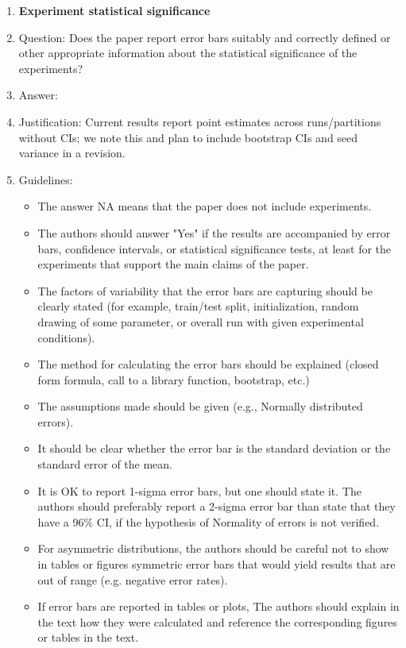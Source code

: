 \documentclass{article}
\begin{document}
\begin{enumerate}
\item {\bf Experiment statistical significance}
    \item[] Question: Does the paper report error bars suitably and correctly defined or other appropriate information about the statistical significance of the experiments?
    \item[] Answer: \answerNo{}
    \item[] Justification: Current results report point estimates across runs/partitions without CIs; we note this and plan to include bootstrap CIs and seed variance in a revision.
    \item[] Guidelines:
    \begin{itemize}
        \item The answer NA means that the paper does not include experiments.
        \item The authors should answer "Yes" if the results are accompanied by error bars, confidence intervals, or statistical significance tests, at least for the experiments that support the main claims of the paper.
        \item The factors of variability that the error bars are capturing should be clearly stated (for example, train/test split, initialization, random drawing of some parameter, or overall run with given experimental conditions).
        \item The method for calculating the error bars should be explained (closed form formula, call to a library function, bootstrap, etc.)
        \item The assumptions made should be given (e.g., Normally distributed errors).
        \item It should be clear whether the error bar is the standard deviation or the standard error of the mean.
        \item It is OK to report 1-sigma error bars, but one should state it. The authors should preferably report a 2-sigma error bar than state that they have a 96\% CI, if the hypothesis of Normality of errors is not verified.
        \item For asymmetric distributions, the authors should be careful not to show in tables or figures symmetric error bars that would yield results that are out of range (e.g. negative error rates).
        \item If error bars are reported in tables or plots, The authors should explain in the text how they were calculated and reference the corresponding figures or tables in the text.
    \end{itemize}


\end{enumerate}
\end{document}
